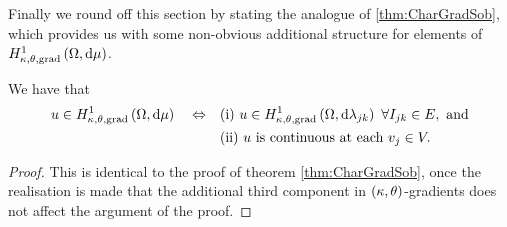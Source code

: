 Finally we round off this section by stating the analogue of \ref{thm:CharGradSob}, which provides us with some non-obvious additional structure for elements of $H^1_{\kappa,\theta,\mathrm{grad}}\left( \Omega, \mathrm{d}\mu \right)$.
\begin{theorem} \label{thm:ktGradSobChar}
	We have that
	\begin{align*}
		u\in\ktgradSob{\ddom}{\ddmes} \quad \Leftrightarrow 
		&\quad\text{(i)} \ u\in\ktgradSob{\ddom}{\lambda_{jk}} \ \forall I_{jk}\in E, \text{ and}\\
		&\quad\text{(ii)} \ u \text{ is continuous at each } v_j\in V.
	\end{align*}
\end{theorem}
\begin{proof}
	This is identical to the proof of theorem \ref{thm:CharGradSob}, once the realisation is made that the additional third component in $\left( \kappa, \theta \right)$-gradients does not affect the argument of the proof.
\end{proof}

